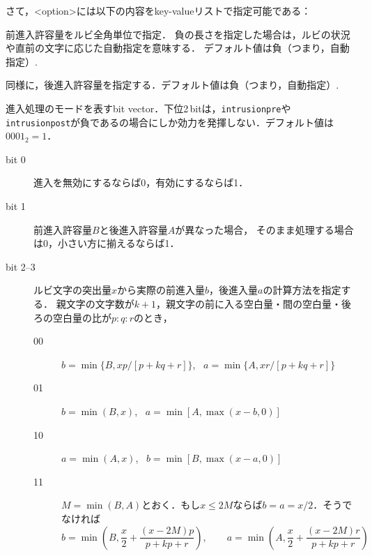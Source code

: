 \documentclass[b5paper,10pt]{ltjsarticle}
\begin{document}
さて，<option>には以下の内容をkey-valueリストで指定可能である：
\begin{description}
\def\makelabel#1{\tt#1}
\item[intrusionpre=<real>] 前進入許容量をルビ全角単位で指定．
負の長さを指定した場合は，ルビの状況や直前の文字に応じた自動指定を意味する．
デフォルト値は負（つまり，自動指定）.

\item[intrusionpost=<real>] 同様に，後進入許容量を指定する．デフォルト値は負（つまり，自動指定）.

\item[mode] 進入処理のモードを表すbit vector．下位2\,bitは，\texttt{intrusionpre}や
\texttt{intrusionpost}が負であるの場合にしか効力を発揮しない．デフォルト値は$0001_2 = 1$．
\begin{description}
 \item[bit 0] 進入を無効にするならば0，有効にするならば1．
 \item[bit 1] 前進入許容量$B$と後進入許容量$A$が異なった場合，
そのまま処理する場合は0，小さい方に揃えるならば1．
 \item[bit 2--3] ルビ文字の突出量$x$から実際の前進入量$b$，後進入量$a$の計算方法を指定する．
親文字の文字数が$k+1$，親文字の前に入る空白量・間の空白量・後ろの空白量の比が$p:q:r$のとき，
\begin{description}
 \item[00] $b=\min\{B, xp/[p+kq+r]\}$, \ $a=\min\{A, xr/[p+kq+r]\}$
 \item[01] $b=\min(B, x)$, \ $a=\min[A, \max(x-b,0)]$
 \item[10] $a=\min(A, x)$, \ $b=\min[B, \max(x-a,0)]$
 \item[11] $M=\min(B,A)$とおく．もし$x\le 2M$ならば$b=a=x/2$．そうでなければ
\[
 b=\min\left(B, \frac x2 + \frac{(x-2M)p}{p+kp+r}\right),\qquad 
 a=\min\left(A, \frac x2 + \frac{(x-2M)r}{p+kp+r}\right)
\]
\end{description}


\end{description}
\end{description}
\end{document}
